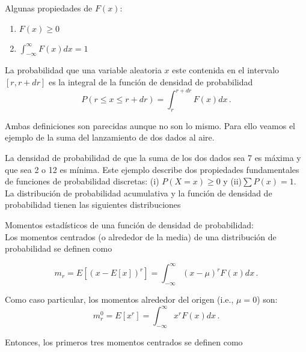 \documentclass[
]{agujournal2019}
\providecommand{\tightlist}{%
  \setlength{\itemsep}{0pt}\setlength{\parskip}{0pt}}\usepackage{longtable,booktabs,array}
\begin{document}
Algunas propiedades de \(F(x)\):\\

\begin{enumerate}
\def\labelenumi{(\arabic{enumi})}
\tightlist
\item
  \(F(x)\ge0\)\\
\item
  \(\int^{\infty}_{-\infty} F(x) dx=1\)\\
\end{enumerate}

La probabilidad que una variable aleatoria \(x\) este contenida en el
intervalo \([r,r+dr]\) es la integral de la función de densidad de
probabilidad \[P(r\le x\le r+dr)=\int^{r+dr}_r F(x)dx\,.\]

Ambas definiciones son parecidas aunque no son lo mismo. Para ello
veamos el ejemplo de la suma del lanzamiento de dos dados al aire.\\

\begin{center}
\end{center}

La densidad de probabilidad de que la suma de los dos dados sea 7 es
máxima y que sea 2 o 12 es mínima. Este ejemplo describe dos propiedades
fundamentales de funciones de probabilidad discretas: (i)
\(P(X=x) \ge 0\) y (ii)\(\sum{P(x)}=1\). La distribución de probabilidad
acumulativa y la función de densidad de probabilidad tienen las
siguientes distribuciones\\

\begin{center}
\end{center}

\vspace{0.5cm}

Momentos estadísticos de una función de densidad de probabilidad:\\

Los momentos centrados (o alrededor de la media) de una distribución de
probabilidad se definen como

\[m_r=E[(x-E[x])^r]=\int^{\infty}_{-\infty} (x-\mu)^rF(x)dx\,.\]

Como caso particular, los momentos alrededor del origen (i.e.,
\(\mu=0\)) son: \[m^0_r=E[x^r]=\int^{\infty}_{-\infty} x^rF(x)dx\,.\]

Entonces, los primeros tres momentos centrados se definen como
\end{document}
